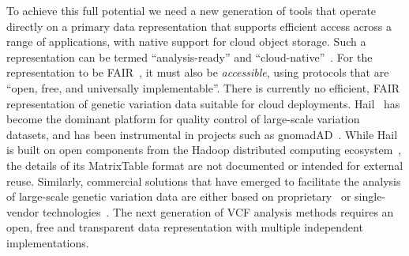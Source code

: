 \documentclass[a4paper,num-refs]{oup-contemporary}
\begin{document}
To achieve this full potential we
need a new generation of tools that operate directly
on a primary data representation that supports
efficient access across a range of applications,
with native support for cloud object storage.
Such a representation can be termed ``analysis-ready''
and ``cloud-native''~\citep{abernathey2021cloud}.
For the representation to be FAIR~\citep{wilkinson2016fair},
it must also be \emph{accessible}, using protocols that are
``open, free, and universally implementable''.
There is currently no efficient, FAIR representation of genetic variation
data suitable for cloud deployments.
Hail~\cite{ganna2016ultra,hail2024} has become the dominant platform
for quality control of large-scale variation datasets,
and has been instrumental in projects such as
gnomadAD~\cite{karczewski2020mutational,chen2024genomic}.
While Hail is built on open components
from the Hadoop distributed computing ecosystem~\citep{white2012hadoop},
the details of its MatrixTable format are not documented
or intended for external reuse.
Similarly, commercial solutions that have emerged to facilitate
the analysis of large-scale genetic variation data are either
based on proprietary~\cite{basespace2024,graf2024,googlelifesciences2024,
awshealthomics2024,microsoftgenomics2024}
or single-vendor technologies~\cite[e.g.][]{tiledb2024,genomicsdb2024}.
The next generation of VCF analysis methods requires
an open, free and transparent data representation
with multiple independent implementations.
\end{document}

